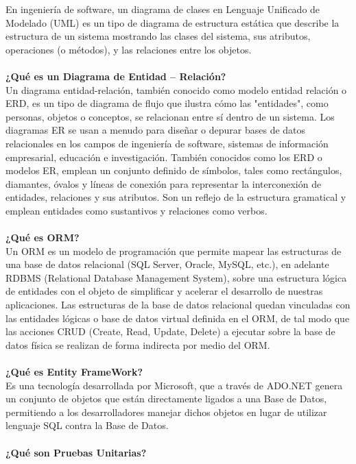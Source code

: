 \begin{flushleft}
En ingeniería de software, un diagrama de clases en Lenguaje Unificado de Modelado (UML) es un tipo de diagrama de estructura estática que describe la estructura de un sistema mostrando las clases del sistema, sus atributos, operaciones (o métodos), y las relaciones entre los objetos.
\textbf{}\\
\textbf{}\\
\textbf {¿Qué es un Diagrama de Entidad – Relación?}\\
Un diagrama entidad-relación, también conocido como modelo entidad relación o ERD, es un tipo de diagrama de flujo que ilustra cómo las "entidades", como personas, objetos o conceptos, se relacionan entre sí dentro de un sistema. Los diagramas ER se usan a menudo para diseñar o depurar bases de datos relacionales en los campos de ingeniería de software, sistemas de información empresarial, educación e investigación. También conocidos como los ERD o modelos ER, emplean un conjunto definido de símbolos, tales como rectángulos, diamantes, óvalos y líneas de conexión para representar la interconexión de entidades, relaciones y sus atributos. Son un reflejo de la estructura gramatical y emplean entidades como sustantivos y relaciones como verbos.
\textbf{}\\
\textbf{}\\
\textbf {¿Qué es ORM?}
\textbf{}\\
Un ORM es un modelo de programación que permite mapear las estructuras de una base de datos relacional (SQL Server, Oracle, MySQL, etc.), en adelante RDBMS (Relational Database Management System), sobre una estructura lógica de entidades con el objeto de simplificar y acelerar el desarrollo de nuestras aplicaciones.
Las estructuras de la base de datos relacional quedan vinculadas con las entidades lógicas o base de datos virtual definida en el ORM, de tal modo que las acciones CRUD (Create, Read, Update, Delete) a ejecutar sobre la base de datos física se realizan de forma indirecta por medio del ORM.
\textbf{}\\
\textbf{}\\
\textbf {¿Qué es Entity FrameWork?}
\textbf{}\\
Es una tecnología desarrollada por Microsoft, que a través de ADO.NET genera un conjunto de objetos que están directamente ligados a una Base de Datos, permitiendo a los desarrolladores manejar dichos objetos en lugar de utilizar lenguaje SQL contra la Base de Datos.
\textbf{}\\
\textbf{}\\
\textbf {¿Qué son Pruebas Unitarias?}

\end{flushleft}
